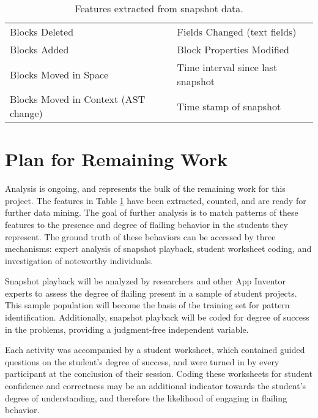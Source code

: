 \begin{table}
\begin{centering}
	\begin{tabular}{l l}
	
	Blocks Deleted 							& Fields Changed (text fields)		\\
	Blocks Added 							& Block Properties Modified			\\
	Blocks Moved in Space 					& Time interval since last snapshot	\\
	Blocks Moved in Context (AST change)	& Time stamp of snapshot			\\

	\end{tabular}
	\caption[Features extracted from snapshots]{Features extracted from snapshot data.}
	\label{tab:features-extracted}
\end{centering}
\end{table}

\section{Plan for Remaining Work}
Analysis is ongoing, and represents the bulk of the remaining work for this project. The features in Table \ref{tab:features-extracted} have been extracted, counted, and are ready for further data mining. The goal of further analysis is to match patterns of these features to the presence and degree of flailing behavior in the students they represent. The ground truth of these behaviors can be accessed by three mechanisms: expert analysis of snapshot playback, student worksheet coding, and investigation of noteworthy individuals.  

Snapshot playback will be analyzed by researchers and other App Inventor experts to assess the degree of flailing present in a sample of student projects. This sample population will become the basis of the training set for pattern identification. Additionally, snapshot playback will be coded for degree of success in the problems, providing a judgment-free independent variable.

Each activity was accompanied by a student worksheet, which contained guided questions on the student's degree of success, and were turned in by every participant at the conclusion of their session. Coding these worksheets for student confidence and correctness may be an additional indicator towards the student's degree of understanding, and therefore the likelihood of engaging in flailing behavior.

